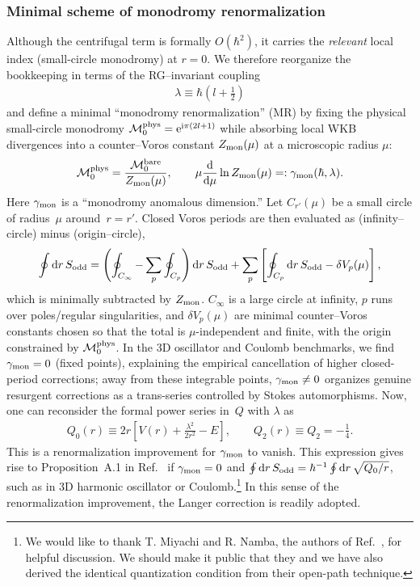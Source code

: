 \subsubsection{Minimal scheme of monodromy renormalization}
Although the centrifugal term is formally $O(\hbar^2)$, it carries the
\textit{relevant} local index (small-circle monodromy) at $r=0$. We therefore reorganize
the bookkeeping in terms of the RG–invariant coupling
\begin{align}
    \lambda\equiv\hbar\left(l+\frac{1}{2}\right)
\end{align}
and define a minimal ``monodromy renormalization'' (MR)
by fixing the physical small-circle monodromy $\mathcal{M}_0^{\mathrm{phys}}
=\mathrm{e}^{\mathrm{i} \pi(2l+1)}$ while absorbing local WKB divergences into a counter–Voros
constant $Z_{\mathrm{mon}}(\mu)$ at a microscopic radius $\mu$:
\begin{align}
\mathcal{M}_0^{\mathrm{phys}}=\frac{\mathcal{M}_0^{\mathrm{bare}}}{Z_{\mathrm{mon}}(\mu)},
\qquad
\mu\frac{\mathrm{d}}{\mathrm{d} \mu}\ln Z_{\mathrm{mon}}(\mu)=:\gamma_{\mathrm{mon}}(\hbar,\lambda).
\end{align}
Here $\gamma_{\mathrm{mon}}$ is a ``monodromy anomalous dimension.''
Let $C_{r'}(\mu)$ be a small circle of radius~$\mu$ around~$r=r'$.
Closed Voros periods are then evaluated as (infinity–circle) minus (origin–circle),
\begin{equation}
\oint \mathrm{d} r\, S_{\mathrm{odd}}
=\left(\oint_{C_\infty}-\sum_{p}\oint_{C_p}\right)\mathrm{d} r\,  S_{\mathrm{odd}}
+\sum_{p}\left[\oint_{C_p} \mathrm{d} r\, S_{\mathrm{odd}}-\delta V_p(\mu)\right],
\end{equation}
which is minimally subtracted by $Z_{\mathrm{mon}}$.
$C_\infty$ is a large circle at infinity, $p$ runs over poles/regular singularities, and $\delta V_p(\mu)$ are minimal counter–Voros constants chosen so that the total is $\mu$-independent and finite, with the origin constrained by $\mathcal{M}_0^{\mathrm{phys}}$.
In the 3D oscillator and Coulomb benchmarks, we find $\gamma_{\mathrm{mon}}=0$ (fixed points), explaining the empirical cancellation of higher closed-period corrections; away from these integrable points, $\gamma_{\mathrm{mon}}\neq 0$ organizes genuine resurgent corrections as a trans-series controlled by Stokes automorphisms.
Now, one can reconsider the formal power series in~$Q$ with $\lambda$ as
\begin{align}
    Q_0(r) \equiv 2r\left[V(r) + \frac{\lambda^2}{2r^2} - E\right], \qquad Q_2(r) \equiv Q_2 = -\frac{1}{4} .
\end{align}
This is a renormalization improvement for $\gamma_{\mathrm{mon}}$ to vanish.
This expression gives rise to Proposition~A.1 in Ref.~\cite{Miyachi:2025ptm} if $\gamma_{\mathrm{mon}}=0$ and $\oint \mathrm{d} r\, S_{\mathrm{odd}}=\hbar^{-1}\oint \mathrm{d} r\, \sqrt{Q_0/r}$, such as in $3$D harmonic oscillator or Coulomb.\footnote{We would like to thank T. Miyachi and R. Namba, the authors of Ref.~\cite{Miyachi:2025ptm}, for helpful discussion. We should make it public that they and we have also derived the identical quantization condition from their open-path technique.}
In this sense of the renormalization improvement, the Langer correction is readily adopted.
